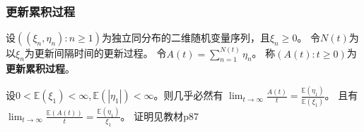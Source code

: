 \documentclass[main]{subfiles}
\begin{document}
\subsubsection{更新累积过程}
\begin{definition}\label{def:renew_accum}
  设\(((\xi_n,\eta_n):n \geq 1)\)为独立同分布的二维随机变量序列，且\(\xi_n \geq 0\)。
  令\(N(t)\)为以\(\xi_n\)为更新间隔时间的更新过程。
  令\(A(t)=\sum_{n=1}^{N(t)} \eta_n\)。
  称\((A(t):t \geq 0)\)为\textbf{更新累积过程}。
\end{definition}
\begin{theorem}\label{the:3.3.3}
  设\(0<\mathbb{E}(\xi_1)<\infty,\mathbb{E}(|\eta_1|)<\infty\)。则几乎必然有
  \(\lim_{t \to \infty}\frac{A(t)}{t}=\frac{\mathbb{E}(\eta_1)}{\mathbb{E}(\xi_1)}\)。
  且有\(\lim_{t \to \infty}\frac{\mathbb{E}(A(t))}{t}=\frac{\mathbb{E}(\eta_1)}{\xi_1}\)。
  证明见教材p87
\end{theorem}
\ifSubfilesClassLoaded{%
  \printindex}{%
}
\end{document}
